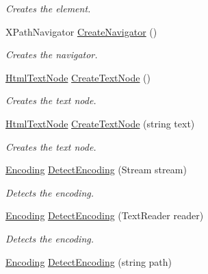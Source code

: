 \begin{DoxyCompactItemize}
\begin{DoxyCompactList}\small\item\em Creates the element. \end{DoxyCompactList}\item 
X\+Path\+Navigator \hyperlink{class_html_agility_pack_1_1_html_document_a6c0c82129a0452708f686a9ac329a0a5}{Create\+Navigator} ()
\begin{DoxyCompactList}\small\item\em Creates the navigator. \end{DoxyCompactList}\item 
\hyperlink{class_html_agility_pack_1_1_html_text_node}{Html\+Text\+Node} \hyperlink{class_html_agility_pack_1_1_html_document_a99b02a7976586083216b10c859f51535}{Create\+Text\+Node} ()
\begin{DoxyCompactList}\small\item\em Creates the text node. \end{DoxyCompactList}\item 
\hyperlink{class_html_agility_pack_1_1_html_text_node}{Html\+Text\+Node} \hyperlink{class_html_agility_pack_1_1_html_document_a533a68a21e689842a948caa6df3e99e5}{Create\+Text\+Node} (string text)
\begin{DoxyCompactList}\small\item\em Creates the text node. \end{DoxyCompactList}\item 
\hyperlink{class_html_agility_pack_1_1_html_document_a220bdf28a5e35f4898075084be2d59f0}{Encoding} \hyperlink{class_html_agility_pack_1_1_html_document_a0822e4ac2ca2afef5b5906ecfad68f30}{Detect\+Encoding} (Stream stream)
\begin{DoxyCompactList}\small\item\em Detects the encoding. \end{DoxyCompactList}\item 
\hyperlink{class_html_agility_pack_1_1_html_document_a220bdf28a5e35f4898075084be2d59f0}{Encoding} \hyperlink{class_html_agility_pack_1_1_html_document_a714da63e5ce9bd5ebe2ce86e9c2802b4}{Detect\+Encoding} (Text\+Reader reader)
\begin{DoxyCompactList}\small\item\em Detects the encoding. \end{DoxyCompactList}\item 
\hyperlink{class_html_agility_pack_1_1_html_document_a220bdf28a5e35f4898075084be2d59f0}{Encoding} \hyperlink{class_html_agility_pack_1_1_html_document_a76392972fe9d293f4715b662cf258df5}{Detect\+Encoding} (string path)

\end{DoxyCompactItemize}
